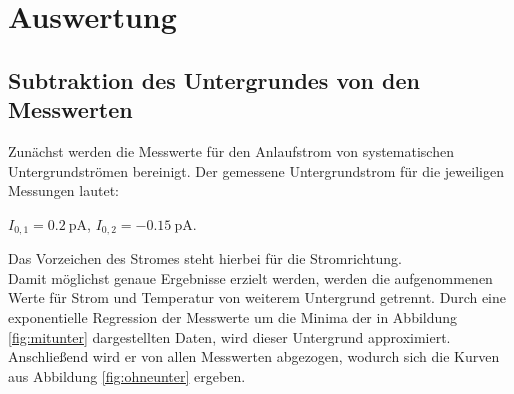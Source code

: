 \section{Auswertung}
\label{sec:Auswertung}
\subsection{Subtraktion des Untergrundes von den Messwerten}
Zunächst werden die Messwerte für den Anlaufstrom von systematischen Untergrundströmen bereinigt. Der gemessene Untergrundstrom für die jeweiligen Messungen lautet:
\begin{center}
  $I_{0,1} = \SI{0.2}{\pico\ampere}$, $I_{0,2} = \SI{-0.15}{\pico\ampere}$.
\end{center}
Das Vorzeichen des Stromes steht hierbei für die Stromrichtung.\\
Damit möglichst genaue Ergebnisse erzielt werden, werden die aufgenommenen Werte für Strom und Temperatur von weiterem Untergrund getrennt. Durch eine exponentielle Regression der Messwerte um die Minima der in Abbildung \ref{fig:mitunter} dargestellten Daten, wird dieser Untergrund approximiert.
Anschließend wird er von allen Messwerten abgezogen, wodurch sich die Kurven aus Abbildung \ref{fig:ohneunter} ergeben.\\
